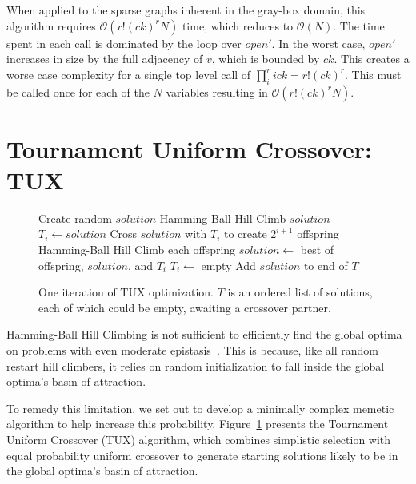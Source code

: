 \documentclass{sig-alternate}
\newcommand{\BigO}[1]{$\mathcal{O}{(#1)}$}
\begin{document}
When applied to the sparse graphs inherent in the gray-box domain, this algorithm
requires \BigO{r!(ck)^rN} time, which reduces to \BigO{N}. The time spent
in each call is dominated by the loop over $open'$. In the worst case, $open'$
increases in size by the full adjacency of $v$, which is bounded by $ck$.
This creates a worse case complexity for a single top level call of
$\prod_{i}^{r} ick = r!(ck)^r$. This must be called once for each
of the $N$ variables resulting in \BigO{r!(ck)^rN}.

\section{Tournament Uniform Crossover: TUX}
\label{sec-tux}
\begin{figure}
  \begin{algorithmic}[1]
    \State Create random $solution$
    \State Hamming-Ball Hill Climb $solution$
        \State $T_i \leftarrow solution$
        \State \Return
      \EndIf
      \State Cross $solution$ with $T_i$ to create $2^{i+1}$ offspring
      \State Hamming-Ball Hill Climb each offspring
      \State $solution \leftarrow$ best of offspring, $solution$, and $T_i$
      \State $T_i \leftarrow$ empty
    \EndFor
    \State Add $solution$ to end of $T$
  \EndProcedure
\end{algorithmic}
  \caption{One iteration of TUX optimization. $T$ is an
           ordered list of solutions, each of which could be empty,
           awaiting a crossover partner.}
  \label{fig-TUX}
\end{figure}

Hamming-Ball Hill Climbing is not sufficient to efficiently find the global optima
on problems with even moderate epistasis~\cite{chicano:2014:ball}. This is because,
like all random restart hill climbers, it relies on random initialization to fall
inside the global optima's basin of attraction.

To remedy this limitation, we set out to develop a minimally complex memetic
algorithm to help increase this probability. Figure~\ref{fig-TUX} presents
the Tournament Uniform Crossover (TUX) algorithm, which combines simplistic
selection with equal probability uniform crossover to generate starting
solutions likely to be in the global optima's basin of attraction.
\end{document}
